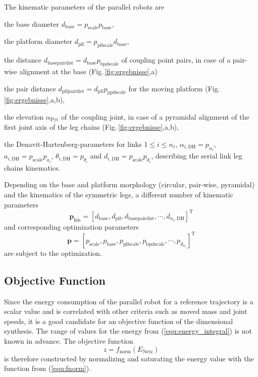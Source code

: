 \documentclass[fleqn,a4paper,10pt]{article}
\newcommand{\bm}[1]{\mathbf{#1}}
\newcommand{\transp}[0]{{\mathrm{T}}}
\begin{document}
\begin{multicols}{2}
The kinematic parameters of the parallel robots are
%
\begin{compactitem}
\item the base diameter $d_\mathrm{base}=p_\mathrm{scale} p_\mathrm{base}$,
\item the platform diameter $d_\mathrm{plf}=p_\mathrm{plfscale} d_\mathrm{base}$,
\item the distance $d_\mathrm{basepairdist}=d_\mathrm{base} p_\mathrm{bpdscale}$ of coupling point pairs, in case of a pair-wise alignment at the base (Fig.\,\ref{fig:ergebnisse},a)
\item the pair distance $d_\mathrm{plfpairdist}=d_\mathrm{plf} p_\mathrm{ppdscale}$ for the moving platform (Fig.\,\ref{fig:ergebnisse},a,b),
\item the elevation $\alpha_\mathrm{Pyr}$ of the coupling joint, in case of a pyramidal alignment of the first joint axis of the leg chains (Fig.\,\ref{fig:ergebnisse},a,b),
\item the Denavit-Hartenberg-parameters for links $1\le i \le n_i$, $\alpha_{i,\mathrm{DH}}=p_{\alpha_i}$, $a_{i,\mathrm{DH}}=p_\mathrm{scale} p_{a_i}$, $\theta_{i,\mathrm{DH}}=p_{\theta_i}$ and $d_{i,\mathrm{DH}}=p_\mathrm{scale} p_{d_i}$, describing the serial link leg chains kinematics.
\end{compactitem}
%
Depending on the base and platform morphology (circular, pair-wise, pyramidal) and the kinematics of the symmetric legs, a different number of kinematic parameters
%
\begin{equation}
\bm{p}_\mathrm{kin}=[d_\mathrm{base}, d_\mathrm{plf}, d_\mathrm{basepairdist}, \cdots, d_{{n_i},\mathrm{DH}} ]^\transp %
\end{equation}
%
and corresponding optimization parameters
%
\begin{equation}
\bm{p}=[p_\mathrm{scale}, p_\mathrm{base}, p_\mathrm{plfscale}, p_\mathrm{bpdscale}, \cdots, p_{d_{n_i}}]^\transp
\end{equation}
%
are subject to the optimization.

\subsection{Objective Function}
\label{sec:opt_objective}

Since the energy consumption of the parallel robot for a reference trajectory is a scalar value and is correlated with other criteria such as moved mass and joint speeds, it is a good candidate for an objective function of the dimensional synthesis.
The range of values for the energy from (\ref{equ:energy_integral}) is not known in advance.
The objective function
%
\begin{equation}
z=f_\mathrm{norm}(E_{\mathrm{Netz}})
\end{equation}
%
is therefore constructed by normalizing and saturating the energy value with the function from (\ref{equ:fnorm}).



\end{multicols}
\end{document}
